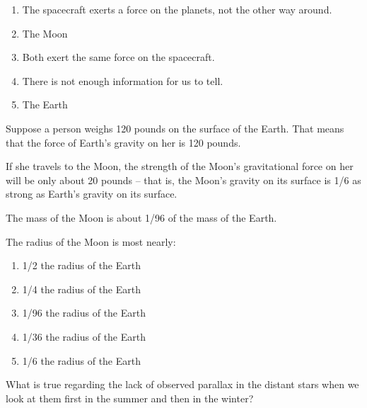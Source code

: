 \documentclass[12pt]{article}
\def\BS{\bigskip}
\begin{document}
\begin{enumerate}
\begin{minipage}{\textwidth}
{\begin{enumerate}[label=(\Alph*)]
\setlength\itemsep{0.0em}
\item{ The spacecraft exerts a force on the planets, not the other way around. }
\item{ The Moon }
\item{ Both exert the same force on the spacecraft.	 }
\item{ There is not enough information for us to tell.	 }
\item{ The Earth }
\end{enumerate}
} %
\end{minipage}


\vspace{0.5in}

\begin{minipage}{\textwidth}
\item{Suppose a person weighs 120 pounds on the surface of the Earth. That means that the force of Earth's gravity on her is 120 pounds.

\BS

If she travels to the Moon, the strength of the Moon's gravitational force on her will be only about 20 pounds -- that is,
the Moon's gravity on its surface is 1/6 as strong as Earth's gravity on its surface.

\BS

The mass of the Moon is about 1/96 of the mass of the Earth.

\BS

The radius of the Moon is most nearly:

\begin{enumerate}[label=(\Alph*)]
\setlength\itemsep{0.0em}
\item{ 1/2 the radius of the Earth }
\item{ 1/4 the radius of the Earth }
\item{ 1/96 the radius of the Earth }
\item{ 1/36 the radius of the Earth }
\item{ 1/6 the radius of the Earth }
\end{enumerate}
} %
\end{minipage}


\vspace{0.5in}

\begin{minipage}{\textwidth}
\item{What is true regarding the lack of observed parallax in the distant stars when we look at them first in the 
summer and then in the winter?

}
\end{minipage}
\end{enumerate}
\end{document}
